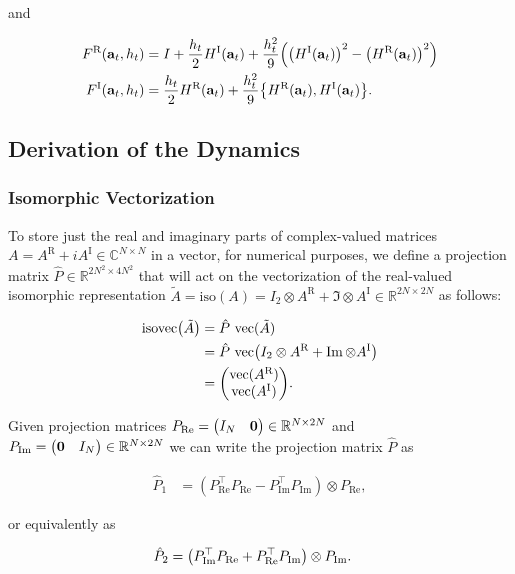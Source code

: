 \documentclass{article}
\newcommand{\isovec}{\text{isovec}}
\newcommand{\HI}{H^{\text{I}}}
\newcommand{\HR}{H^{\text{R}}}
\newcommand{\FR}{F^{\text{R}}}
\newcommand{\FI}{F^{\text{I}}}
\newcommand{\AR}{A^{\text{R}}}
\newcommand{\AI}{A^{\text{I}}}
\newcommand{\Pre}{P_{\text{Re}}}
\newcommand{\Pim}{P_{\text{Im}}}
\begin{document}
\noindent
and

\begin{align*}
  \FR(\vb{a}_t, h_t) &= I + \frac{h_t}{2} \HI(\vb{a}_t) + \frac{h_t^2}{9}\qty(\qty(\HI(\vb{a}_t))^2 - \qty(\HR(\vb{a}_t))^2) \\
  \FI(\vb{a}_t, h_t) &= \frac{h_t}{2} \HR(\vb{a}_t) + \frac{h_t^2}{9}\qty{\HR(\vb{a}_t),\HI(\vb{a}_t)}.
\end{align*}


\newpage

\subsection{Derivation of the Dynamics}

\subsubsection*{Isomorphic Vectorization}

To store just the real and imaginary parts of complex-valued matrices $A = \AR + i \AI \in \mathbb{C}^{N \times N}$ in a vector, for numerical purposes,  we define a projection matrix $\hat P \in \mathbb{R}^{2N^2 \times 4N^2}$ that will act on the vectorization of the real-valued isomorphic representation $\tilde A = \text{iso}(A) = I_2 \otimes \AR + \Im \otimes \AI \in \mathbb{R}^{2N \times 2N}$ as follows: 

\begin{align*}
  \isovec\qty(\tilde A)
  &= \hat P \ \text{vec}(\tilde A) \\
  &= \hat P \ \text{vec}\qty(I_2 \otimes \AR + \Im \otimes \AI) \\
  &= \mqty(\text{vec}(\AR) \\ \text{vec}(\AI)).
\end{align*}

Given projection matrices $\Pre = \mqty(I_N & \vb{0}) \in \mathbb{R}^{N \times 2N}$ and $\Pim = \mqty(\vb{0} & I_N) \in \mathbb{R}^{N \times 2N}$ we can write the projection matrix $\hat P$ as

\begin{align*}
  \hat P_1 &= (\Pre^\top\Pre - \Pim^\top\Pim) \otimes \Pre, 
\end{align*}

\noindent
or equivalently as

\begin{align*}
  \hat P_2 &= \qty(\Pim^\top\Pre + \Pre^\top\Pim) \otimes \Pim.
\end{align*}
\end{document}
